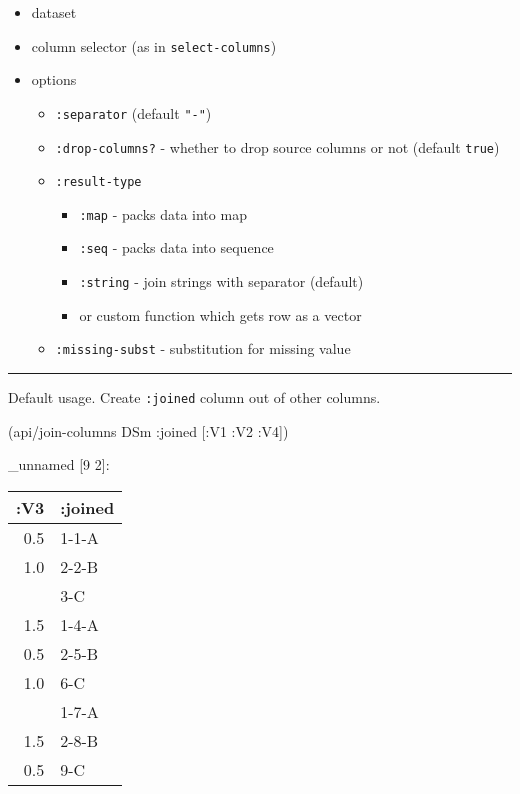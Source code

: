 \documentclass[]{article}
\newenvironment{Shaded}{\begin{snugshade}}{\end{snugshade}}
\newcommand{\AttributeTok}[1]{\textcolor[rgb]{0.77,0.63,0.00}{#1}}
\newcommand{\NormalTok}[1]{#1}
\providecommand{\tightlist}{%
  \setlength{\itemsep}{0pt}\setlength{\parskip}{0pt}}
\begin{document}
\begin{itemize}
\tightlist
\item
  dataset
\item
  column selector (as in \texttt{select-columns})
\item
  options

  \begin{itemize}
  \tightlist
  \item
    \texttt{:separator} (default \texttt{"-"})
  \item
    \texttt{:drop-columns?} - whether to drop source columns or not
    (default \texttt{true})
  \item
    \texttt{:result-type}

    \begin{itemize}
    \tightlist
    \item
      \texttt{:map} - packs data into map
    \item
      \texttt{:seq} - packs data into sequence
    \item
      \texttt{:string} - join strings with separator (default)
    \item
      or custom function which gets row as a vector
    \end{itemize}
  \item
    \texttt{:missing-subst} - substitution for missing value
  \end{itemize}
\end{itemize}

\begin{center}\rule{0.5\linewidth}{0.5pt}\end{center}

Default usage. Create \texttt{:joined} column out of other columns.

\begin{Shaded}
\begin{Highlighting}[]
\NormalTok{(api/join-columns DSm }\AttributeTok{:joined}\NormalTok{ [}\AttributeTok{:V1} \AttributeTok{:V2} \AttributeTok{:V4}\NormalTok{])}
\end{Highlighting}
\end{Shaded}

\_unnamed {[}9 2{]}:

\begin{longtable}[]{@{}rl@{}}
\toprule
:V3 & :joined\tabularnewline
\midrule
\endhead
0.5 & 1-1-A\tabularnewline
1.0 & 2-2-B\tabularnewline
& 3-C\tabularnewline
1.5 & 1-4-A\tabularnewline
0.5 & 2-5-B\tabularnewline
1.0 & 6-C\tabularnewline
& 1-7-A\tabularnewline
1.5 & 2-8-B\tabularnewline
0.5 & 9-C\tabularnewline
\bottomrule
\end{longtable}
\end{document}
